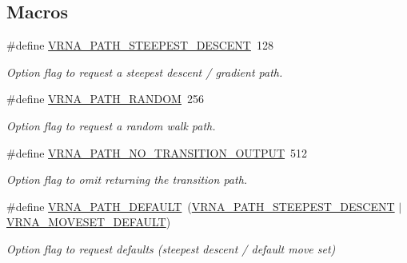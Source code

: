 \subsection*{Macros}
\begin{DoxyCompactItemize}
\item 
\#define \mbox{\hyperlink{group__paths_ga705cea2b3243a38a2d6e3b1e141ed061}{V\+R\+N\+A\+\_\+\+P\+A\+T\+H\+\_\+\+S\+T\+E\+E\+P\+E\+S\+T\+\_\+\+D\+E\+S\+C\+E\+NT}}~128
\begin{DoxyCompactList}\small\item\em Option flag to request a steepest descent / gradient path. \end{DoxyCompactList}\item 
\#define \mbox{\hyperlink{group__paths_ga0b84bd36bfd783130297797c51dd85ae}{V\+R\+N\+A\+\_\+\+P\+A\+T\+H\+\_\+\+R\+A\+N\+D\+OM}}~256
\begin{DoxyCompactList}\small\item\em Option flag to request a random walk path. \end{DoxyCompactList}\item 
\#define \mbox{\hyperlink{group__paths_ga1ee63e54ecf136491e12ff03ede2622d}{V\+R\+N\+A\+\_\+\+P\+A\+T\+H\+\_\+\+N\+O\+\_\+\+T\+R\+A\+N\+S\+I\+T\+I\+O\+N\+\_\+\+O\+U\+T\+P\+UT}}~512
\begin{DoxyCompactList}\small\item\em Option flag to omit returning the transition path. \end{DoxyCompactList}\item 
\#define \mbox{\hyperlink{group__paths_gaf1bb1f8fec8d24e3b821f621b19f77b4}{V\+R\+N\+A\+\_\+\+P\+A\+T\+H\+\_\+\+D\+E\+F\+A\+U\+LT}}~(\mbox{\hyperlink{group__paths_ga705cea2b3243a38a2d6e3b1e141ed061}{V\+R\+N\+A\+\_\+\+P\+A\+T\+H\+\_\+\+S\+T\+E\+E\+P\+E\+S\+T\+\_\+\+D\+E\+S\+C\+E\+NT}} $\vert$ \mbox{\hyperlink{group__neighbors_gaa5ffec4dd0d02df320f123e6888154d1}{V\+R\+N\+A\+\_\+\+M\+O\+V\+E\+S\+E\+T\+\_\+\+D\+E\+F\+A\+U\+LT}})
\begin{DoxyCompactList}\small\item\em Option flag to request defaults (steepest descent / default move set) \end{DoxyCompactList}\end{DoxyCompactItemize}
